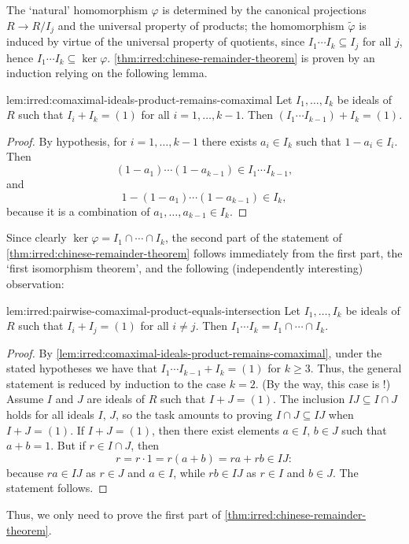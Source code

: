 The `natural' homomorphism $\varphi$ is determined by the canonical
projections $R \to R/I_j$ and the universal property of products; the
homomorphism $\tilde\varphi$ is induced by virtue of the universal
property of quotients, since $I_1 \cdots I_k \subseteq I_j$ for all
$j$, hence $I_1 \cdots I_k \subseteq
\ker\varphi$. \cref{thm:irred:chinese-remainder-theorem} is proven by an induction relying
on the following lemma.
\begin{lem}{}{lem:irred:comaximal-ideals-product-remains-comaximal}
  Let $I_1, \ldots, I_k$ be ideals of $R$ such that $I_i + I_k = (1)$
  for all $i = 1, \ldots, k-1$. Then
  $(I_1 \cdots I_{k-1}) + I_k = (1)$.
\end{lem}

\begin{proof}
  By hypothesis, for $i = 1, \ldots, k-1$ there exists $a_i \in I_k$
  such that $1 - a_i \in I_i$. Then
  \[(1 - a_1) \cdots (1 - a_{k-1}) \in I_1 \cdots I_{k-1},\] and
  \[1 - (1 - a_1) \cdots (1 - a_{k-1}) \in I_k,\] because it is a
  combination of $a_1, \ldots, a_{k-1} \in I_k$.
\end{proof}
Since clearly $\ker\varphi = I_1 \cap \cdots \cap I_k$, the second
part of the statement of \cref{thm:irred:chinese-remainder-theorem} follows immediately from
the first part, the `first isomorphism theorem', and the following
(independently interesting) observation:
\begin{lem}{}{lem:irred:pairwise-comaximal-product-equals-intersection}
  Let $I_1, \ldots, I_k$ be ideals of $R$ such that $I_i + I_j = (1)$
  for all $i \neq j$. Then
  $I_1 \cdots I_k = I_1 \cap \cdots \cap I_k$.
\end{lem}

\begin{proof}
  By \cref{lem:irred:comaximal-ideals-product-remains-comaximal}, under the stated hypotheses we have that
  $I_1 \cdots I_{k-1} + I_k = (1)$ for $k \geq 3$. Thus, the general
  statement is reduced by induction to the case $k = 2$. (By the way,
  this case is !)
  Assume $I$ and $J$ are ideals of $R$ such that $I + J = (1)$. The
  inclusion $IJ \subseteq I \cap J$ holds for all ideals $I$, $J$, so
  the task amounts to proving $I \cap J \subseteq IJ$ when
  $I + J = (1)$.  If $I + J = (1)$, then there exist elements
  $a \in I$, $b \in J$ such that $a + b = 1$. But if $r \in I \cap J$,
  then
  \[r = r \cdot 1 = r(a + b) = ra + rb \in IJ:\] because $ra \in IJ$
  as $r \in J$ and $a \in I$, while $rb \in IJ$ as $r \in I$ and
  $b \in J$. The statement follows.
\end{proof}
Thus, we only need to prove the first part of \cref{thm:irred:chinese-remainder-theorem}.

